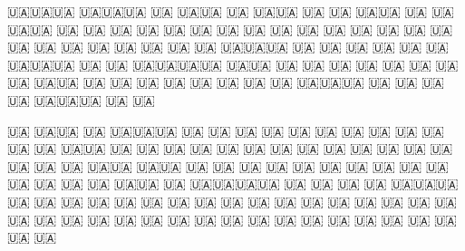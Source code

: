  
 
 
 
 

🇺🇦🇺🇦🇺🇦         🇺🇦🇺🇦🇺🇦          🇺🇦           🇺🇦🇺🇦                🇺🇦
🇺🇦🇺🇦             🇺🇦    🇺🇦        🇺🇦🇺🇦         🇺🇦   🇺🇦           🇺🇦🇺🇦
🇺🇦                 🇺🇦    🇺🇦       🇺🇦  🇺🇦        🇺🇦    🇺🇦         🇺🇦  🇺🇦
🇺🇦                 🇺🇦    🇺🇦      🇺🇦    🇺🇦       🇺🇦     🇺🇦       🇺🇦    🇺🇦
🇺🇦                🇺🇦     🇺🇦     🇺🇦      🇺🇦      🇺🇦🇺🇦🇺🇦       🇺🇦      🇺🇦 
🇺🇦               🇺🇦      🇺🇦    🇺🇦🇺🇦🇺🇦🇺🇦     🇺🇦     🇺🇦     🇺🇦🇺🇦🇺🇦🇺🇦
🇺🇦🇺🇦         🇺🇦        🇺🇦   🇺🇦          🇺🇦    🇺🇦      🇺🇦   🇺🇦          🇺🇦
🇺🇦🇺🇦        🇺🇦         🇺🇦  🇺🇦            🇺🇦   🇺🇦     🇺🇦   🇺🇦            🇺🇦
🇺🇦🇺🇦🇺🇦   🇺🇦          🇺🇦 🇺🇦              🇺🇦  🇺🇦🇺🇦🇺🇦   🇺🇦              🇺🇦

🇺🇦     🇺🇦🇺🇦      🇺🇦  🇺🇦🇺🇦🇺🇦         🇺🇦        🇺🇦  🇺🇦 🇺🇦        🇺🇦  🇺🇦 
🇺🇦    🇺🇦 🇺🇦    🇺🇦    🇺🇦     🇺🇦      🇺🇦🇺🇦         🇺🇦    🇺🇦        🇺🇦  🇺🇦 
 🇺🇦  🇺🇦  🇺🇦 🇺🇦       🇺🇦      🇺🇦    🇺🇦  🇺🇦        🇺🇦    🇺🇦        🇺🇦  🇺🇦
  🇺🇦🇺🇦   🇺🇦🇺🇦        🇺🇦      🇺🇦   🇺🇦    🇺🇦       🇺🇦    🇺🇦        🇺🇦  🇺🇦
    🇺🇦     🇺🇦 🇺🇦       🇺🇦     🇺🇦   🇺🇦 🇺🇦🇺🇦       🇺🇦    🇺🇦🇺🇦🇺🇦🇺🇦  🇺🇦
   🇺🇦      🇺🇦   🇺🇦     🇺🇦🇺🇦🇺🇦   🇺🇦       🇺🇦      🇺🇦    🇺🇦        🇺🇦  🇺🇦
  🇺🇦       🇺🇦     🇺🇦   🇺🇦          🇺🇦         🇺🇦     🇺🇦    🇺🇦        🇺🇦  🇺🇦
 🇺🇦        🇺🇦      🇺🇦  🇺🇦         🇺🇦           🇺🇦    🇺🇦    🇺🇦        🇺🇦  🇺🇦
🇺🇦         🇺🇦      🇺🇦  🇺🇦        🇺🇦             🇺🇦   🇺🇦    🇺🇦        🇺🇦  🇺🇦


